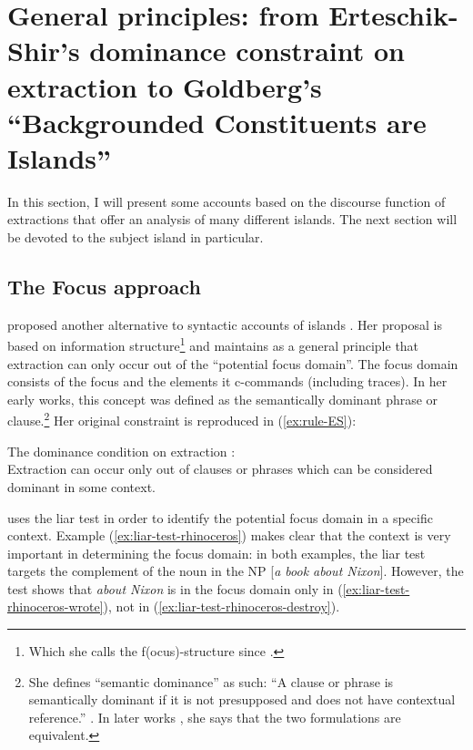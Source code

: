 \section[General principles: from Erteschik-Shir (1973) to Goldberg's BIC]{General principles: from Erteschik-Shir's dominance constraint on extraction to Goldberg's ``Backgrounded Constituents are Islands''}

In this section, I will present some accounts based on the discourse function of extractions that offer an analysis of many different islands. The next section will be devoted to the subject island in particular.
 
\subsection{The Focus approach}

\citeauthor{Erteschik-Shir.1973} proposed another alternative to syntactic accounts of islands \citep{Erteschik-Shir.1973,Erteschik-Shir.1997,Erteschik-Shir.2006}. Her proposal is based on information structure\footnote{Which she calls the f(ocus)-structure since \citet{Erteschik-Shir.1997}.} and maintains as a general principle that extraction can only occur out of the ``potential focus domain''. The focus domain consists of the focus and the elements it c-commands (including traces). In her early works, this concept was defined as the semantically dominant phrase or clause.\footnote{She defines ``semantic dominance'' as such: ``A clause or phrase is semantically dominant if it is not presupposed and does not have contextual reference.'' \citep[22]{Erteschik-Shir.1973}.
In later works \citep[e.g.][]{Erteschik-Shir.2006}, she says that the two formulations are equivalent.}
Her original constraint is reproduced in (\ref{ex:rule-ES}):

\ea The dominance condition on extraction \citep[27]{Erteschik-Shir.1973}:\\ 
Extraction can occur only out of clauses or phrases which can be considered dominant in some context. 
\label{ex:rule-ES}
\z 

\citeauthor{Erteschik-Shir.1973} uses the liar test in order to identify the potential focus domain in a specific context. Example (\ref{ex:liar-test-rhinoceros}) makes clear that the context is very important in determining the focus domain: in both examples, the liar test targets the complement of the noun in the NP [\emph{a book about Nixon}]. However, the test shows that \emph{about Nixon} is in the focus domain only in (\ref{ex:liar-test-rhinoceros-wrote}), not in (\ref{ex:liar-test-rhinoceros-destroy}).

